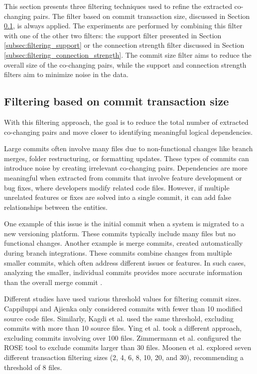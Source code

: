 This section presents three filtering techniques used to refine the extracted co-changing pairs. The filter based on commit transaction size, discussed in Section \ref{subsec:filtering_transaction_size}, is always applied. The experiments are performed by combining this filter with one of the other two filters: the support filter presented in Section \ref{subsec:filtering_support} or the connection strength filter discussed in Section \ref{subsec:filtering_connection_strength}. The commit size filter aims to reduce the overall size of the co-changing pairs, while the support and connection strength filters aim to minimize noise in the data.

\subsection{Filtering based on commit transaction size}
\label{subsec:filtering_transaction_size}

With this filtering approach, the goal is to reduce the total number of extracted co-changing pairs and move closer to identifying meaningful logical dependencies. 

Large commits often involve many files due to non-functional changes like branch merges, folder restructuring, or formatting updates. These types of commits can introduce noise by creating irrelevant co-changing pairs. Dependencies are more meaningful when extracted from commits that involve feature development or bug fixes, where developers modify related code files. However, if multiple unrelated features or fixes are solved into a single commit, it can add false relationships between the entities.

One example of this issue is the initial commit when a system is migrated to a new versioning platform. These commits typically include many files but no functional changes. Another example is merge commits, created automatically during branch integrations. These commits combine changes from multiple smaller commits, which often address different issues or features. In such cases, analyzing the smaller, individual commits provides more accurate information than the overall merge commit \cite{cluster-access}.

Different studies have used various threshold values for filtering commit sizes. Cappiluppi and Ajienka \cite{DBLP:journals/jss/AjienkaC17, DBLP:journals/ese/AjienkaCC18} only considered commits with fewer than 10 modified source code files. Similarly, Kagdi et al. used the same threshold, excluding commits with more than 10 source files. Ying et al. \cite{Ying-co-change} took a different approach, excluding commits involving over 100 files. Zimmermann et al. \cite{Zimmermann:2004:MVH:998675.999460} configured the ROSE tool to exclude commits larger than 30 files. Moonen et al. \cite{Moonen-commit} explored seven different transaction filtering sizes (2, 4, 6, 8, 10, 20, and 30), recommending a threshold of 8 files.



